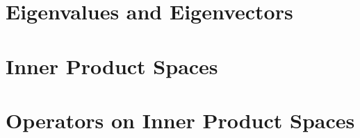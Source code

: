 \documentclass[11pt]{report}
\begin{document}
  \chapter{Eigenvalues and Eigenvectors}
  
   \clearpage

  
   \clearpage

  
   \clearpage

  
   \clearpage

  
   \clearpage

  \chapter{Inner Product Spaces}
  
  
  

  \chapter{Operators on Inner Product Spaces}
  
  
  
  
  
  
\end{document}
